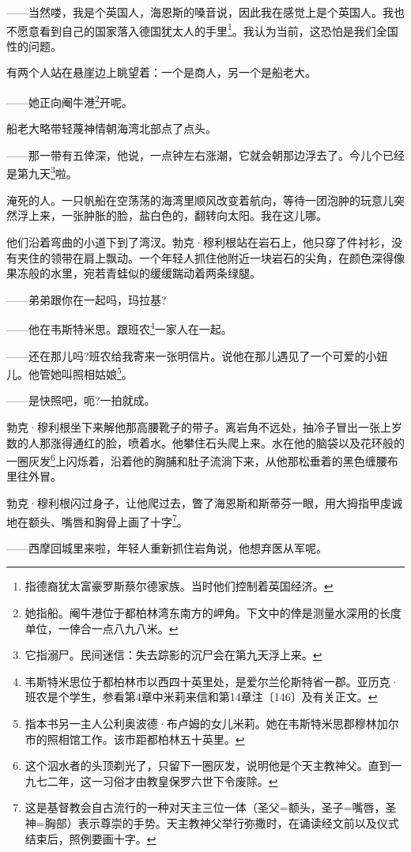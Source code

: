 \par ——当然喽，我是个英国人，海恩斯的嗓音说，因此我在感觉上是个英国人。我也不愿意看到自己的国家落入德国犹太人的手里\footnote{指德裔犹太富豪罗斯蔡尔德家族。当时他们控制着英国经济。}。我认为当前，这恐怕是我们全国性的问题。
\par 有两个人站在悬崖边上眺望着：一个是商人，另一个是船老大。
\par ——她正向阉牛港\footnote{她指船。阉牛港位于都柏林湾东南方的岬角。下文中的倖是测量水深用的长度单位，一倖合一点八九八米。}开呢。
\par 船老大略带轻蔑神情朝海湾北部点了点头。
\par ——那一带有五倖深，他说，一点钟左右涨潮，它就会朝那边浮去了。今儿个已经是第九天\footnote{它指溺尸。民间迷信：失去踪影的沉尸会在第九天浮上来。}啦。
\par 淹死的人。一只帆船在空荡荡的海湾里顺风改变着航向，等待一团泡肿的玩意儿突然浮上来，一张肿胀的脸，盐白色的，翻转向太阳。我在这儿哪。
\par 他们沿着弯曲的小道下到了湾汊。勃克·穆利根站在岩石上，他只穿了件衬衫，没有夹住的领带在肩上飘动。一个年轻人抓住他附近一块岩石的尖角，在颜色深得像果冻般的水里，宛若青蛙似的缓缓踹动着两条绿腿。
\par ——弟弟跟你在一起吗，玛拉基?
\par ——他在韦斯特米思。跟班农\footnote{韦斯特米思位于都柏林市以西四十英里处，是爱尔兰伦斯特省一郡。亚历克·班农是个学生，参看第4章中米莉来信和第14章注〔146〕及有关正文。}一家人在一起。
\par ——还在那儿吗?班农给我寄来一张明信片。说他在那儿遇见了一个可爱的小妞儿。他管她叫照相姑娘\footnote{指本书另一主人公利奥波德·布卢姆的女儿米莉。她在韦斯特米思郡穆林加尔市的照相馆工作。该市距都柏林五十英里。}。
\par ——是快照吧，呃?一拍就成。
\par 勃克·穆利根坐下来解他那高腰靴子的带子。离岩角不远处，抽冷子冒出一张上岁数的人那涨得通红的脸，喷着水。他攀住石头爬上来。水在他的脑袋以及花环般的一圈灰发\footnote{这个泅水者的头顶剃光了，只留下一圈灰发，说明他是个天主教神父。直到一九七二年，这一习俗才由教皇保罗六世下令废除。}上闪烁着，沿着他的胸脯和肚子流淌下来，从他那松垂着的黑色缠腰布里往外冒。
\par 勃克·穆利根闪过身子，让他爬过去，瞥了海恩斯和斯蒂芬一眼，用大拇指甲虔诚地在额头、嘴唇和胸骨上画了十字\footnote{这是基督教会自古流行的一种对天主三位一体（圣父=额头，圣子=嘴唇，圣神=胸部）表示尊崇的手势。天主教神父举行弥撒时，在诵读经文前以及仪式结束后，照例要画十字。}。
\par ——西摩回城里来啦，年轻人重新抓住岩角说，他想弃医从军呢。
